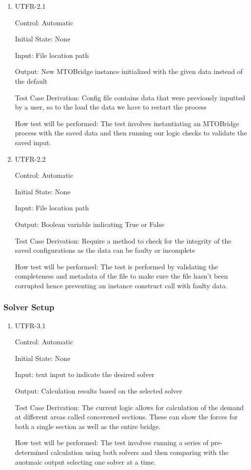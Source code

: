 \documentclass[12pt, titlepage]{article}
\begin{document}
\begin{enumerate}

\item{UTFR-2.1\\}

Control: Automatic
					
Initial State: None
					
Input: File location path
					
Output: New MTOBridge instance initialized with the given data instead of the default 

Test Case Derivation: Config file contains data that were previously inputted by a user, so to the load the data we have to restart the process 
					
How test will be performed: The test involves instantiating an MTOBridge process with the saved data and then running our logic checks to validate the saved input.
					
\item{UTFR-2.2\\}

Control: Automatic
					
Initial State: None
					
Input: File location path 
					
Output: Boolean variable indicating True or False 

Test Case Derivation: Require a method to check for the integrity of the saved configurations as the data can be faulty or incomplete

How test will be performed: The test is performed by validating the completeness and metadata of the file to make sure the file hasn't been corrupted hence preventing an instance construct call with faulty data.

\end{enumerate}

\subsubsection{Solver Setup}

\begin{enumerate}

\item{UTFR-3.1\\}

Control: Automatic
					
Initial State: None
					
Input: text input to indicate the desired solver 
					
Output: Calculation results based on the selected solver

Test Case Derivation: The current logic allows for calculation of the demand at different areas called concerened sections. These can show the forces for both a single section as well as the entire bridge. 

How test will be performed: The test involves running a series of pre-determined calculation using both solvers and then comparing with the auotmaic output selecting one solver at a time. 
					

\end{enumerate}
\end{document}
